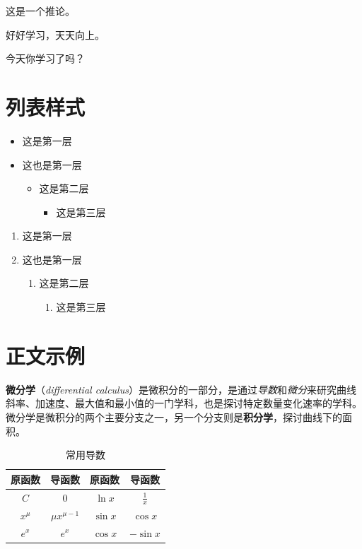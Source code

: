 \documentclass[
  10pt,
  twoside,
  openany,
  b5paper, %
  colorscheme = bootstrap-v4, %
]{qyxf-book}
\numberwithin{equation}{section}
\begin{document}
\begin{corollary}
 这是一个推论。
\end{corollary}

\begin{note}
  好好学习，天天向上。
\end{note}

\begin{alert}
  今天你学习了吗？
\end{alert}

\section{列表样式}
\begin{itemize}
  \item 这是第一层
  \item 这也是第一层
  \begin{itemize}
    \item 这是第二层
    \begin{itemize}
      \item 这是第三层
    \end{itemize}
  \end{itemize}
\end{itemize}

\begin{enumerate}
  \item 这是第一层
  \item 这也是第一层
  \begin{enumerate}
    \item 这是第二层
    \begin{enumerate}
      \item 这是第三层
    \end{enumerate}
  \end{enumerate}
\end{enumerate}

\section{正文示例}

\textbf{微分学}（\emph{differential calculus}）是微积分的一部分，是通过\emph{导数}和\emph{微分}来研究曲线斜率、加速度、最大值和最小值的一门学科，也是探讨特定数量变化速率的学科。微分学是微积分的两个主要分支之一，另一个分支则是\textbf{积分学}，探讨曲线下的面积。


\begin{table}[htbp]
  \centering
  \caption{常用导数}
  \begin{tabular}{cccc}
    \toprule
    \textbf{原函数} & \textbf{导函数}   & \textbf{原函数} & \textbf{导函数} \\
    \midrule
    $C$             & $0$               & $\ln x$         & $\frac{1}{x}$   \\
    $x^\mu$         & $\mu x^{\mu - 1}$ & $\sin x$        & $\cos x$        \\
    $e^x$           & $e^x$             & $\cos x$        & $-\sin x$       \\
    \bottomrule
  \end{tabular}
\end{table}
\end{document}
